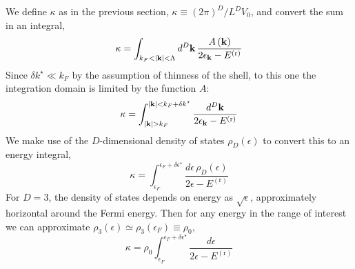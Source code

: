 We define $\kappa$ as in the previous section, $\kappa \equiv (2\pi)^D/ L^D V_0$, and convert the sum in an integral,
\[
	\kappa = \int_{k_F<\abs{\mathbf{k}}<\Lambda} d^D \mathbf{k} \, \frac{A\left({\mathbf{k}}\right)}{2 \epsilon_\mathbf{k} - E^{(\mathrm{r})}}
\]
Since $\delta k^\star \ll k_F$ by the assumption of thinness of the shell, to this one the integration domain is limited by the function $A$:
\[
	\kappa = \int_{\abs{\mathbf{k}} > k_F}^{\abs{\mathbf{k}} < k_F+\delta k^\star} \frac{d^D \mathbf{k}}{2 \epsilon_\mathbf{k} - E^{(\mathrm{r})}}
\]
We make use of the $D$-dimensional density of states $\rho_D(\epsilon)$ to convert this to an energy integral,
\[
	\kappa = \int_{\epsilon_F}^{\epsilon_F+\delta\epsilon^\star} \frac{d\epsilon \, \rho_D(\epsilon)}{2 \epsilon - E^{(\mathrm{r})}}
\]
For $D=3$, the density of states depends on energy as $\sqrt{\epsilon}$, approximately horizontal around the Fermi energy. Then for any energy in the range of interest we can approximate $\rho_3 (\epsilon) \simeq \rho_3 (\epsilon_F) \equiv \rho_0$,
\[
	\kappa = \rho_0 \int_{\epsilon_F}^{\epsilon_F+\delta\epsilon^\star} \frac{d\epsilon}{2 \epsilon - E^{(\mathrm{r})}}
\]

